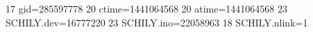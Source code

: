 17 gid=285597778
20 ctime=1441064568
20 atime=1441064568
23 SCHILY.dev=16777220
23 SCHILY.ino=22058963
18 SCHILY.nlink=1